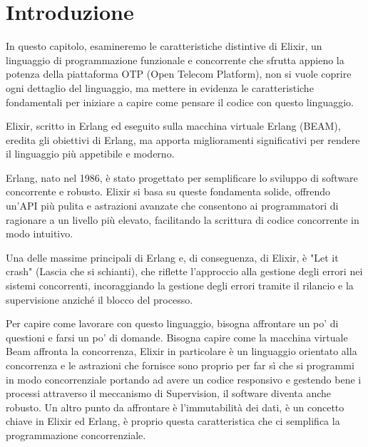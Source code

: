 \section{Introduzione}



In questo capitolo, esamineremo le caratteristiche distintive
di Elixir, un linguaggio di programmazione funzionale e
concorrente che sfrutta appieno la potenza della piattaforma
OTP (Open Telecom Platform), non si vuole coprire ogni dettaglio
del linguaggio, ma mettere in evidenza le caratteristiche
fondamentali per iniziare a capire come pensare il codice
con questo linguaggio.

Elixir, scritto in Erlang ed eseguito sulla macchina virtuale
Erlang (BEAM), eredita gli obiettivi di Erlang, ma apporta
miglioramenti significativi per rendere il linguaggio più
appetibile e moderno.

Erlang, nato nel 1986, è stato progettato per semplificare
lo sviluppo di software concorrente e robusto.
Elixir si basa su queste fondamenta solide, offrendo un'API
più pulita e astrazioni avanzate che consentono ai programmatori
di ragionare a un livello più elevato, facilitando la scrittura
di codice concorrente in modo intuitivo.

Una delle massime principali di Erlang e, di conseguenza,
di Elixir, è "Let it crash" (Lascia che si schianti),
che riflette l'approccio alla gestione degli errori nei sistemi
concorrenti, incoraggiando la gestione degli errori tramite
il rilancio e la supervisione anziché il blocco del processo.

Per capire come lavorare con questo linguaggio, bisogna affrontare
un po' di questioni e farsi un po' di domande.
Bisogna capire come la macchina virtuale Beam affronta la concorrenza,
Elixir in particolare è un linguaggio orientato alla concorrenza e 
le astrazioni che fornisce sono proprio per far sì che
si programmi in modo concorrenziale portando ad avere un
codice responsivo e gestendo bene i processi attraverso 
il meccanismo di Supervision, il software diventa anche robusto.
Un altro punto da affrontare è l'immutabilità dei dati, è un concetto
chiave in Elixir ed Erlang, è proprio questa caratteristica
che ci semplifica la programmazione concorrenziale.

